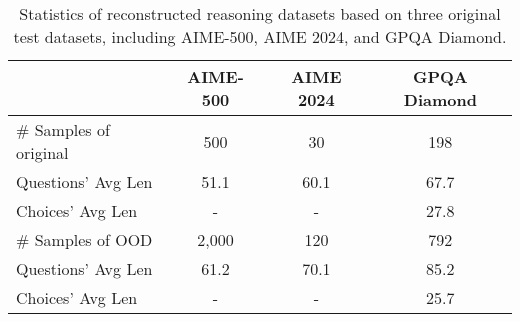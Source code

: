 \begin{table}
\centering
\caption{Statistics of reconstructed reasoning datasets based on three original test datasets, including AIME-500, AIME 2024, and GPQA Diamond.}
\label{tab:data_statistics}
 \begin{adjustbox}{width=0.99\columnwidth}{
\begin{tabular}{lccc} 
\toprule
                             & AIME-500 & AIME 2024 & GPQA Diamond \\ 
\midrule
\# Samples of original  & 500      & 30        & 198                      \\
Questions' Avg Len       & 51.1     & 60.1      & 67.7                     \\
Choices' Avg Len         & -        & -         & 27.8                     \\ 
\hline
\# Samples of OOD & 2,000      & 120        & 792                      \\
Questions' Avg Len       & 61.2     & 70.1      & 85.2                     \\
Choices' Avg Len         & -        & -         & 25.7                     \\
\bottomrule
\end{tabular}}    \end{adjustbox}
\end{table}